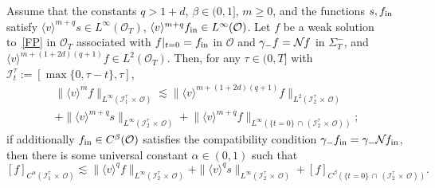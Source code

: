 \documentclass[10pt]{amsart}
\theoremstyle{definition}\newtheorem{defi}[theo]{Definition}\newtheorem{rema}[theo]{Remark}\newtheorem{exam}[theo]{Example}\newtheorem{exem}[theo]{Example}\newtheorem{nota}[theo]{Notation}
\newcommand*\fin {f_{\rm in}}
\newcommand*\I {\mathcal{I}}
\newcommand*\NN {{\mathcal{N}\hspace{-.3mm}}}
\newcommand*\OO {\mathcal{O}}
\newcommand{\lv}{\langle v\rangle}
\begin{document}
\begin{prop}\label{localr}
Assume that the constants $q>1+d$, $\beta\in(0,1]$, $m\ge0$, and the functions $s,\fin$ satisfy $\lv^{m+q}s\in L^\infty(\OO_T)$, $\lv^{m+q}\fin\in L^\infty(\OO)$. Let $f$ be a weak solution to~\eqref{FP} in $\OO_T$ associated with $f|_{t=0}=\fin$ in $\OO$ and $\gamma_-f=\NN f$ in $\Sigma_T^-$, and $\lv^{m+(1+2d)(q+1)} f\in L^2(\OO_T)$. Then, for any $\tau\in(0,T]$ with $\I_t^\tau:=[\max\{0,\tau-t\},\tau]$,
\begin{multline}\label{bddr}
\big\|\lv^mf\big\|_{L^\infty(\I_1^\tau\,\times\,\OO)}
\lesssim \big\|\lv^{m+(1+2d)(q+1)} f\big\|_{L^2\left(\I_2^\tau\,\times\,\OO\right)}\\
+ \big\|\lv^{m+q}s\big\|_{L^\infty\left(\I_2^\tau\,\times\,\OO\right)} +
\big\|\lv^{m+q}f\big\|_{L^\infty\left(\{t=0\}\,\cap\,\left(\I_2^\tau\,\times\,\OO\right)\right)};
\end{multline}
if additionally $\fin\in C^\beta(\OO)$ satisfies the compatibility condition $\gamma_-\fin=\gamma_-\NN\fin$, then there is some universal constant $\alpha\in(0,1)$ such that
\begin{equation}\label{holderr}
 [f]_{C^\alpha(\I_1^\tau\,\times\,\OO)}
\lesssim \|\lv^{q} f\|_{L^\infty\left(\I_2^\tau\,\times\,\OO\right)} + \|\lv^qs\|_{L^\infty\left(\I_2^\tau\,\times\,\OO\right)} +[f]_{C^\beta
\left(\{t=0\}\,\cap\,\left(\I_2^\tau\,\times\,\OO\right)\right)}.
\end{equation}
\end{prop}
\end{document}
